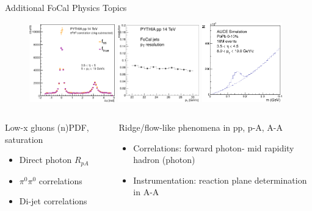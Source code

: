 \documentclass[aspectratio=169,10pt]{beamer}
\begin{document}
  \begin{frame}{Additional FoCal Physics Topics}
    \begin{figure}
      \includegraphics[width=0.33\textwidth]{OakridgeTalk/pi0pi0-corr-focal.pdf}\hspace{0.2cm}
      \includegraphics[width=0.315\textwidth]{OakridgeTalk/jetResol_focal.pdf}\hspace{0.2cm}
      \includegraphics[width=0.31\textwidth]{OakridgeTalk/PbPb_signal_exa_8pt10.pdf}
    \end{figure}
    \begin{columns}
      \begin{column}{5.2cm}
        Low-x gluons (n)PDF, saturation
        \begin{itemize}
        \item Direct photon $R_{pA}$
        \item $\pi^0\pi^0$ correlations
        \item Di-jet correlations
        \end{itemize}
        \vspace{0.2cm}
      \end{column}
      \begin{column}{7.cm}
        Ridge/flow-like phenomena in pp, p-A, A-A
        \begin{itemize}
        \item Correlations: forward photon- mid rapidity hadron (photon)
        \item Instrumentation: reaction plane determination in A-A
        \end{itemize}
       

\end{column}
\end{columns}
\end{frame}
\end{document}
